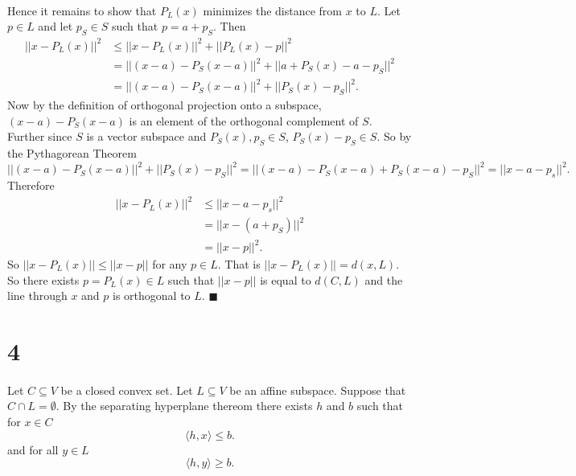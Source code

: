 \documentclass[letterpaper,12pt,oneside,onecolumn]{article}
\begin{document}
\paragraph{}
Hence it remains to show that $P_L(x)$ minimizes the distance from $x$ to $L$. Let $p \in L$ and let $p_S \in S$ such that $p = a + p_S$. Then
\begin{align*}
||x- P_L(x) ||^2 &\leq ||x - P_L(x) ||^2 + ||P_L(x) - p||^2 \\
&= ||(x-a) - P_S(x-a) ||^2 + ||a + P_S(x) - a - p_S ||^2 \\
&= ||(x-a) - P_S(x-a) ||^2 + ||P_S(x) - p_S||^2.
\end{align*}
Now by the definition of orthogonal projection onto a subspace, $(x-a) - P_S(x-a)$ is an element of the orthogonal complement of $S$. Further since $S$ is a vector subspace and $P_S(x), p_S \in S$, $P_S(x) - p_S \in S$. So by the Pythagorean Theorem
$$ ||(x-a) - P_S(x-a) ||^2 + ||P_S(x) - p_S||^2 = ||(x-a) - P_S(x-a) + P_S(x-a) - p_S||^2 = ||x-a - p_s||^2.$$
Therefore 
\begin{align*}
||x- P_L(x) ||^2 &\leq ||x-a - p_s||^2 \\
&= ||x - (a+ p_S) ||^2 \\
&= ||x - p||^2.
\end{align*}
So $||x- P_L(x) || \leq ||x-p||$ for any $p \in L$. That is $||x - P_L(x)|| = d(x,L)$. So there exists $p = P_L(x) \in L$ such that $||x-p||$ is equal to $d(C, L)$ and the line through $x$ and $p$ is orthogonal to $L$. $\blacksquare$
\section*{4}
\paragraph{}
Let $C \subseteq V$ be a closed convex set. Let $L \subseteq V$ be an affine subspace. Suppose that $C \cap L = \emptyset$. By the separating hyperplane thereom there exists $h$ and $b$ such that for $x \in C$
$$\langle h, x \rangle \leq b.$$
and for all $y \in L$
$$\langle h, y \rangle \geq b.$$
\end{document}
